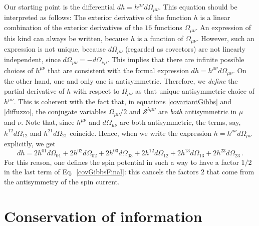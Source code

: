 \documentclass[12pt,aps,prd,nofootinbib,noshowkeys,noshowpacs,longbibliography,
superscriptaddress,tightenlines,floatfix,preprintnumbers]{revtex4-2}
\begin{document}
Our starting point is the differential $dh=h^{\mu \nu}d\Omega_{\mu \nu}$. This equation should be interpreted as follows: The exterior derivative of the function $h$ is a linear combination of the exterior derivatives of the $16$ functions $\Omega_{\mu \nu}$. An expression of this kind can always be written, because $h$ is a function of $\Omega_{\mu \nu}$. However, such an expression is not unique, because $d\Omega_{\mu \nu}$ (regarded as covectors) are not linearly independent, since $d\Omega_{\mu \nu}=-d\Omega_{\nu \mu}$. This implies that there are infinite possible choices of $h^{\mu \nu}$ that are consistent with the formal expression $dh=h^{\mu \nu}d\Omega_{\mu \nu}$. On the other hand, one and only one is antisymmetric. Therefore, we \emph{define} the partial derivative of $h$ with respect to $\Omega_{\mu \nu}$ as that unique antisymmetric choice of $h^{\mu \nu}$. This is coherent with the fact that, in equations \eqref{covariantGibbs} and \eqref{diffuzzo}, the conjugate variables $\Omega_{\mu \nu}/2$ and $\mathcal{S}^{\lambda \mu \nu}$ are \emph{both} antisymmetric in $\mu$ and $\nu$. Note that, since $h^{\mu \nu}$ and $d\Omega_{\mu \nu}$ are both antisymmetric, the terms, say, $h^{12}d\Omega_{12}$ and $h^{21}d\Omega_{21}$ coincide. Hence, when we write the expression $h=h^{\mu \nu}d\Omega_{\mu \nu}$ explicitly, we get
\begin{equation}
    dh = 2h^{01}d\Omega_{01} + 2h^{02}d\Omega_{02}+2h^{03}d\Omega_{03} + 2h^{12}d\Omega_{12}+2h^{13}d\Omega_{13} + 2h^{23}d\Omega_{23}\,.
\end{equation}
For this reason, one defines the spin potential in such a way to have a factor $1/2$ in the last term of Eq.~\eqref{covGibbsFinal}: this cancels the factors $2$ that come from the antisymmetry of the spin current. 

\section{Conservation of information}\label{conservationofinfo}
\end{document}
